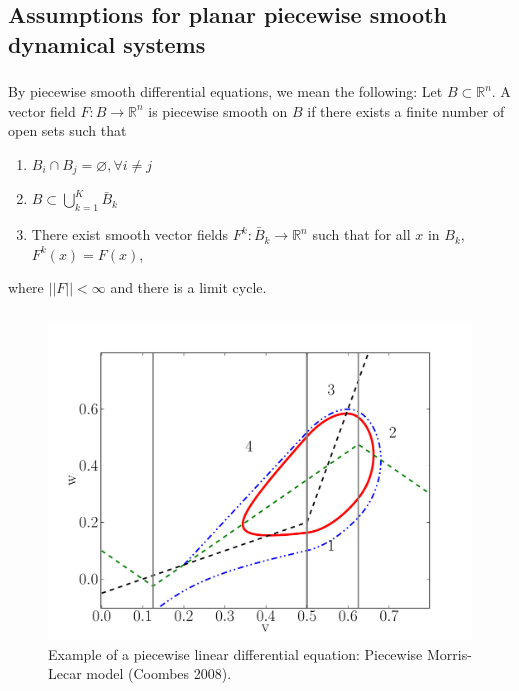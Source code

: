 \documentclass{beamer}
\begin{document}
\subsection{Assumptions for planar piecewise smooth dynamical systems}
\begin{frame}
\frametitle{\insertsection}
  \framesubtitle{\insertsubsection}

   By piecewise smooth differential equations, we mean the following: Let $B \subset \mathbb{R}^n$.  A vector field $F:B \rightarrow \mathbb{R}^n$ is piecewise smooth on $B$ if there exists a finite number of open sets such that
   \begin{enumerate}
    \item $B_i \cap B_j = \varnothing, \forall i \neq j$
    \item $B \subset \bigcup_{k=1}^K \bar{B}_k$
    \item There exist smooth vector fields $F^k: \bar{B}_k \rightarrow \mathbb{R}^n$ such that  for all $x$ in $B_k$, $F^k(x)=F(x)$, 
  \end{enumerate}
  where $||F|| < \infty$ and there is a limit cycle.
\end{frame}


\begin{frame}
\begin{figure}
\frametitle{\insertsection}
  \framesubtitle{\insertsubsection}
 \includegraphics[width=.8\textwidth]{pml_fig.pdf}
 \caption{Example of a piecewise linear differential equation: Piecewise Morris-Lecar model (Coombes 2008).}
\end{figure}
\end{frame}
\end{document}
